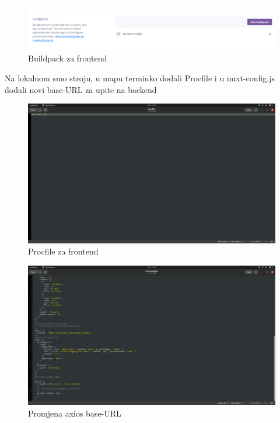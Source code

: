 			\begin{figure}[H]
				\centering
				\includegraphics[scale=0.45]{slike/BuildpackFrontend.PNG}
				\caption{Buildpack za frontend}
				\label{fig:promjene}
			\end{figure}
		
			Na lokalnom smo stroju, u mapu terminko dodali Procfile i u nuxt-config.js dodali novi base-URL za upite na backend
			
			\begin{figure}[H]
				\centering
				\includegraphics[scale=0.25]{slike/ProcFileFrontend.PNG}
				\caption{Procfile za frontend}
				\label{fig:promjene}
			\end{figure}
			
			\begin{figure}[H]
				\centering
				\includegraphics[scale=0.25]{slike/PromjenaFrontend.PNG}
				\caption{Promjena axios base-URL}
				\label{fig:promjene}
			\end{figure}
		
